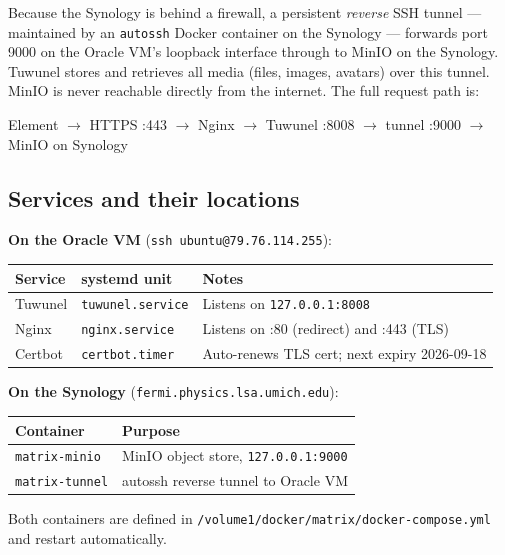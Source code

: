 \documentclass[11pt]{article}
\begin{document}
Because the Synology is behind a firewall, a persistent \emph{reverse} SSH
tunnel --- maintained by an \texttt{autossh} Docker container on the Synology
--- forwards port 9000 on the Oracle VM's loopback interface through to MinIO
on the Synology.  Tuwunel stores and retrieves all media (files, images,
avatars) over this tunnel.  MinIO is never reachable directly from the
internet.  The full request path is:

\begin{center}
Element \;$\to$\; HTTPS :443 \;$\to$\; Nginx \;$\to$\; Tuwunel :8008 \;$\to$\; tunnel :9000 \;$\to$\; MinIO on Synology
\end{center}

\subsection*{Services and their locations}

\noindent\textbf{On the Oracle VM} (\texttt{ssh ubuntu@79.76.114.255}):

\begin{center}
\begin{tabular}{lll}
\hline
Service & systemd unit & Notes \\
\hline
Tuwunel & \texttt{tuwunel.service} & Listens on \texttt{127.0.0.1:8008} \\
Nginx   & \texttt{nginx.service}   & Listens on :80 (redirect) and :443 (TLS) \\
Certbot & \texttt{certbot.timer}   & Auto-renews TLS cert; next expiry 2026-09-18 \\
\hline
\end{tabular}
\end{center}

\noindent\textbf{On the Synology} (\texttt{fermi.physics.lsa.umich.edu}):

\begin{center}
\begin{tabular}{ll}
\hline
Container & Purpose \\
\hline
\texttt{matrix-minio}  & MinIO object store, \texttt{127.0.0.1:9000} \\
\texttt{matrix-tunnel} & autossh reverse tunnel to Oracle VM \\
\hline
\end{tabular}
\end{center}

Both containers are defined in
\texttt{/volume1/docker/matrix/docker-compose.yml} and restart automatically.
\end{document}
